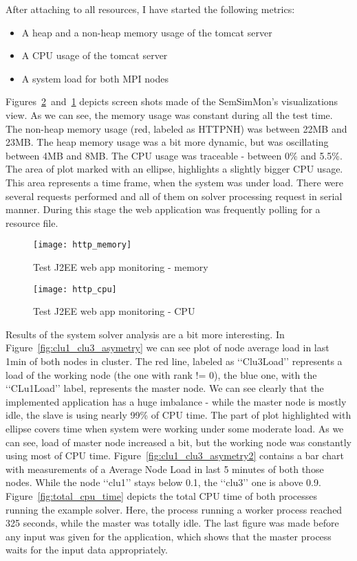 After attaching to all resources, I have started the following metrics:

\begin{itemize}
\item A heap and a non-heap memory usage of the tomcat server
\item A CPU usage of the tomcat server
\item A system load for both MPI nodes
\end{itemize}

Figures~\ref{fig:http_cpu}~and~\ref{fig:http_memory} depicts screen shots made of the SemSimMon\rq{}s visualizations view. As we can see, the memory usage was constant during all the test time. The non-heap memory usage (red, labeled as HTTPNH) was between 22MB and 23MB. The heap memory usage was a bit more dynamic, but was oscillating between 4MB and 8MB. The CPU usage was  traceable - between 0\% and 5.5\%. The area of plot marked with an ellipse, highlights a slightly bigger CPU usage. This area represents a time frame, when the system was under load. There were several requests performed and all of them on solver processing request in serial manner. During this stage the web application was frequently polling for a resource file. 

\begin{figure}[ht]
\centering
\texttt{[image: http\_memory]}
\caption{Test J2EE web app monitoring - memory}
\label{fig:http_memory}
\end{figure}

\begin{figure}[ht]
\centering
\texttt{[image: http\_cpu]}
\caption{Test J2EE web app monitoring - CPU}
\label{fig:http_cpu}
\end{figure}


Results of the system solver analysis are a bit more interesting. In Figure~\ref{fig:clu1_clu3_asymetry} we can see plot of node average load in last 1min of both nodes in cluster. The red line, labeled as \lq\lq{}Clu3Load\rq\rq{} represents a load of the working node (the one with rank != 0), the blue one, with the \lq\lq{}CLu1Load\rq\rq{} label, represents the master node. We can see clearly that the implemented application has a huge imbalance - while the master node is mostly idle, the slave is using nearly 99\% of CPU time. The part of plot highlighted with ellipse covers time when system were working under some moderate load. As we can see, load of master node increased a bit, but the working node was constantly using most of CPU time. Figure~\ref{fig:clu1_clu3_asymetry2} contains a bar chart with measurements of a Average Node Load in last 5 minutes of both those nodes. While the node \lq\lq{}clu1\rq\rq{} stays below 0.1, the \lq\lq{}clu3\rq\rq{} one is above 0.9. Figure~\ref{fig:total_cpu_time} depicts the total CPU time of both processes running the example solver. Here, the process running a worker process reached 325 seconds, while the master was totally idle. The last figure was made before any input was given for the application, which shows that the master process waits for the input data appropriately.

